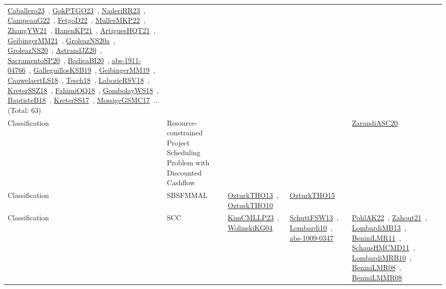 {\begin{longtable}{lp{3cm}>{\raggedright\arraybackslash}p{6cm}>{\raggedright\arraybackslash}p{6cm}>{\raggedright\arraybackslash}p{8cm}}
\href{../works/Caballero23.pdf}{Caballero23}~\cite{Caballero23}, \href{../works/GokPTGO23.pdf}{GokPTGO23}~\cite{GokPTGO23}, \href{../works/NaderiRR23.pdf}{NaderiRR23}~\cite{NaderiRR23}, \href{../works/CampeauG22.pdf}{CampeauG22}~\cite{CampeauG22}, \href{../works/FetgoD22.pdf}{FetgoD22}~\cite{FetgoD22}, \href{../works/MullerMKP22.pdf}{MullerMKP22}~\cite{MullerMKP22}, \href{../works/ZhangYW21.pdf}{ZhangYW21}~\cite{ZhangYW21}, \href{../works/HanenKP21.pdf}{HanenKP21}~\cite{HanenKP21}, \href{../works/ArtiguesHQT21.pdf}{ArtiguesHQT21}~\cite{ArtiguesHQT21}, \href{../works/GeibingerMM21.pdf}{GeibingerMM21}~\cite{GeibingerMM21}, \href{../works/GroleazNS20a.pdf}{GroleazNS20a}~\cite{GroleazNS20a}, \href{../works/GroleazNS20.pdf}{GroleazNS20}~\cite{GroleazNS20}, \href{../works/AstrandJZ20.pdf}{AstrandJZ20}~\cite{AstrandJZ20}, \href{../works/SacramentoSP20.pdf}{SacramentoSP20}~\cite{SacramentoSP20}, \href{../works/BadicaBI20.pdf}{BadicaBI20}~\cite{BadicaBI20}, \href{../works/abs-1911-04766.pdf}{abs-1911-04766}~\cite{abs-1911-04766}, \href{../works/GalleguillosKSB19.pdf}{GalleguillosKSB19}~\cite{GalleguillosKSB19}, \href{../works/GeibingerMM19.pdf}{GeibingerMM19}~\cite{GeibingerMM19}, \href{../works/CauwelaertLS18.pdf}{CauwelaertLS18}~\cite{CauwelaertLS18}, \href{../works/Tesch18.pdf}{Tesch18}~\cite{Tesch18}, \href{../works/LaborieRSV18.pdf}{LaborieRSV18}~\cite{LaborieRSV18}, \href{../works/KreterSSZ18.pdf}{KreterSSZ18}~\cite{KreterSSZ18}, \href{../works/FahimiOQ18.pdf}{FahimiOQ18}~\cite{FahimiOQ18}, \href{../works/GombolayWS18.pdf}{GombolayWS18}~\cite{GombolayWS18}, \href{../works/BaptisteB18.pdf}{BaptisteB18}~\cite{BaptisteB18}, \href{../works/KreterSS17.pdf}{KreterSS17}~\cite{KreterSS17}, \href{../works/MossigeGSMC17.pdf}{MossigeGSMC17}~\cite{MossigeGSMC17}... (Total: 63)\\
Classification & Resource-constrained Project Scheduling Problem with Discounted Cashflow &  &  & \href{../works/ZarandiASC20.pdf}{ZarandiASC20}~\cite{ZarandiASC20}\\
Classification & SBSFMMAL & \href{../works/OzturkTHO13.pdf}{OzturkTHO13}~\cite{OzturkTHO13}, \href{../works/OzturkTHO10.pdf}{OzturkTHO10}~\cite{OzturkTHO10} & \href{../works/OzturkTHO15.pdf}{OzturkTHO15}~\cite{OzturkTHO15} & \\
Classification & SCC & \href{../works/KimCMLLP23.pdf}{KimCMLLP23}~\cite{KimCMLLP23}, \href{../works/WolinskiKG04.pdf}{WolinskiKG04}~\cite{WolinskiKG04} & \href{../works/SchuttFSW13.pdf}{SchuttFSW13}~\cite{SchuttFSW13}, \href{../works/Lombardi10.pdf}{Lombardi10}~\cite{Lombardi10}, \href{../works/abs-1009-0347.pdf}{abs-1009-0347}~\cite{abs-1009-0347} & \href{../works/PohlAK22.pdf}{PohlAK22}~\cite{PohlAK22}, \href{../works/Zahout21.pdf}{Zahout21}~\cite{Zahout21}, \href{../works/LombardiMB13.pdf}{LombardiMB13}~\cite{LombardiMB13}, \href{../works/BeniniLMR11.pdf}{BeniniLMR11}~\cite{BeniniLMR11}, \href{../works/SchausHMCMD11.pdf}{SchausHMCMD11}~\cite{SchausHMCMD11}, \href{../works/LombardiMRB10.pdf}{LombardiMRB10}~\cite{LombardiMRB10}, \href{../works/BeniniLMR08.pdf}{BeniniLMR08}~\cite{BeniniLMR08}, \href{../works/BeniniLMMR08.pdf}{BeniniLMMR08}~\cite{BeniniLMMR08}\\

\end{longtable}}
